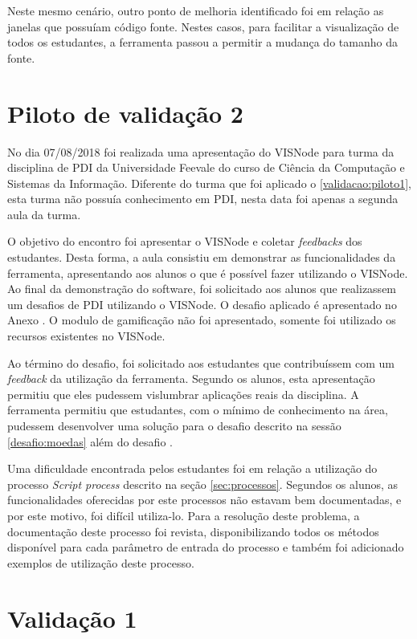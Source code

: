 \documentclass[
	12pt,				%
	oneside,			%
	a4paper,			%
	english,			%
	french,				%
	spanish,			%
	brazil,				%
	]{abntex2}
\begin{document}
Neste mesmo cenário, outro ponto de melhoria identificado foi em relação as janelas que possuíam código fonte. Nestes casos, para facilitar a visualização de todos os estudantes, a ferramenta  passou a permitir a mudança do tamanho da fonte.

\section{Piloto de validação 2}

No dia 07/08/2018 foi realizada uma apresentação do VISNode para turma da disciplina de PDI da Universidade Feevale do curso de Ciência da Computação e Sistemas da Informação. Diferente do turma que foi aplicado o \ref{validacao:piloto1}, esta turma não possuía conhecimento em PDI, nesta data foi apenas a segunda aula da turma. 

O objetivo do encontro foi apresentar o VISNode e coletar \textit{feedbacks} dos estudantes. Desta forma, a aula consistiu em demonstrar as funcionalidades da ferramenta, apresentando aos alunos o que é possível fazer utilizando o VISNode. Ao final da demonstração do software, foi solicitado aos alunos que realizassem um desafios de PDI utilizando o VISNode. O desafio aplicado é apresentado no Anexo \label{desafio:estatistica}. O modulo de gamificação não foi apresentado, somente foi utilizado os recursos existentes no VISNode.

Ao término do desafio, foi solicitado aos estudantes que contribuíssem com um \textit{feedback} da utilização da ferramenta. Segundo os alunos, esta apresentação permitiu que eles pudessem vislumbrar aplicações reais da disciplina. A ferramenta permitiu que estudantes, com o mínimo de conhecimento na área, pudessem desenvolver uma solução para o desafio descrito na sessão \ref{desafio:moedas} além do desafio \label{desafio:estatistica}.

Uma dificuldade encontrada pelos estudantes foi em relação a utilização do processo \textit{Script process} descrito na seção \ref{sec:processos}. Segundos os alunos, as funcionalidades oferecidas por este processos não estavam bem documentadas, e por este motivo, foi difícil utiliza-lo. Para a resolução deste problema, a documentação deste processo foi revista, disponibilizando todos os métodos disponível para cada parâmetro de entrada do processo e também foi adicionado exemplos de utilização deste processo.

\section{Validação 1}
\end{document}
